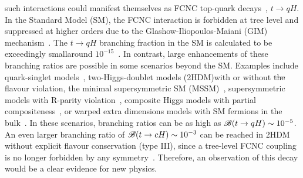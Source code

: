 \documentclass[PAPER, coverpage, atlasdraft=true, texlive=2016, UKenglish]{\ATLASLATEXPATH atlasdoc}
\providecommand{\DIFadd}[1]{{\protect\color{blue}\uwave{#1}}} %
\providecommand{\DIFdel}[1]{{\protect\color{red}\sout{#1}}}                      %
\providecommand{\DIFaddbegin}{} %
\providecommand{\DIFaddend}{} %
\providecommand{\DIFdelbegin}{} %
\providecommand{\DIFdelend}{} %
\begin{document}
such interactions could manifest themselves as FCNC top-quark decays~\cite{Agashe:2013hma}, $t\to qH$.  
In the Standard Model (SM), the FCNC interaction is forbidden at tree level and suppressed at higher orders due to the Glashow-Iliopoulos-Maiani (GIM) mechanism~\cite{Glashow:1970gm}. The $t\to qH$ branching fraction in the SM is calculated to be exceedingly small\DIFaddbegin \DIFadd{, }\DIFaddend around $10^{-15}$~\cite{Eilam:1990zc,Mele:1998ag,AguilarSaavedra:2004wm,Zhang:2013xya}. 
In contrast, large enhancements of these branching ratios are possible in some scenarios beyond the SM.
Examples include quark-singlet models~\cite{AguilarSaavedra:2002kr}, two-Higgs-doublet models (2HDM)\DIFaddbegin \DIFadd{~\mbox{%
\cite{Branco:2hdm2012} }\hspace{0pt}%
}\DIFaddend with or without \DIFdelbegin \DIFdel{the }\DIFdelend flavour violation,
the minimal supersymmetric SM (MSSM)~\cite{Bejar:2000ub, Guasch:1999jp,Cao:2007dk,Cao:2014udj},
supersymmetric models with R-parity violation~\cite{Eilam:2001dh}, composite Higgs models with partial compositeness~\cite{Azatov:2014lha}, 
or warped extra dimensions models with SM fermions in the bulk~\cite{Azatov:2009na}. 
In these scenarios, branching ratios can be as high as $\mathscr{B}(t\to qH) \sim 10^{-5}$. 
An even larger branching ratio of  $\mathscr{B}(t\to cH) \sim 10^{-3}$ can be reached in 2HDM without explicit flavour conservation (type III),
since a tree-level FCNC coupling is no longer forbidden by any symmetry~\cite{Cheng:1987rs,Baum:2008qm,Chen:2013qta,Chiang:2015cba,Crivellin:2015hha,Botella:2015hoa, Gori:2017tvg,Chiang:2017fjr}. 
Therefore, an observation of this decay would be a clear evidence for new physics.
\DIFdelbegin %
\end{document}
